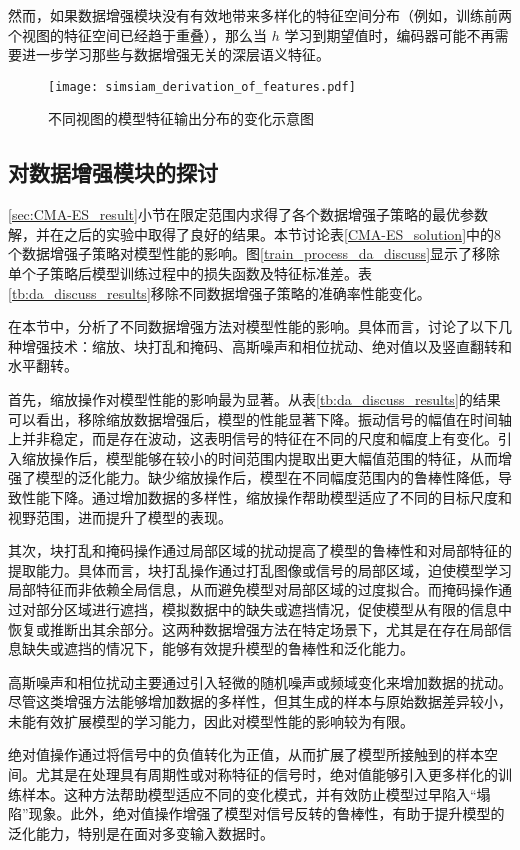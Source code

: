 \documentclass[master]{thesis-uestc}
\begin{document}
然而，如果数据增强模块没有有效地带来多样化的特征空间分布（例如，训练前两个视图的特征空间已经趋于重叠），那么当 \( h \) 学习到期望值时，编码器可能不再需要进一步学习那些与数据增强无关的深层语义特征。

\begin{figure}[h]
    \centering
    \texttt{[image: simsiam\_derivation\_of\_features.pdf]}
    \caption{不同视图的模型特征输出分布的变化示意图}
    \label{simsiam_derivation_of_features}
\end{figure}

\subsection{对数据增强模块的探讨}
\ref{sec:CMA-ES_result}小节在限定范围内求得了各个数据增强子策略的最优参数解，并在之后的实验中取得了良好的结果。本节讨论表\ref{CMA-ES_solution}中的8个数据增强子策略对模型性能的影响。图\ref{train_process_da_discuss}显示了移除单个子策略后模型训练过程中的损失函数及特征标准差。表\ref{tb:da_discuss_results}移除不同数据增强子策略的准确率性能变化。

在本节中，分析了不同数据增强方法对模型性能的影响。具体而言，讨论了以下几种增强技术：缩放、块打乱和掩码、高斯噪声和相位扰动、绝对值以及竖直翻转和水平翻转。

首先，缩放操作对模型性能的影响最为显著。从表\ref{tb:da_discuss_results}的结果可以看出，移除缩放数据增强后，模型的性能显著下降。振动信号的幅值在时间轴上并非稳定，而是存在波动，这表明信号的特征在不同的尺度和幅度上有变化。引入缩放操作后，模型能够在较小的时间范围内提取出更大幅值范围的特征，从而增强了模型的泛化能力。缺少缩放操作后，模型在不同幅度范围内的鲁棒性降低，导致性能下降。通过增加数据的多样性，缩放操作帮助模型适应了不同的目标尺度和视野范围，进而提升了模型的表现。

其次，块打乱和掩码操作通过局部区域的扰动提高了模型的鲁棒性和对局部特征的提取能力。具体而言，块打乱操作通过打乱图像或信号的局部区域，迫使模型学习局部特征而非依赖全局信息，从而避免模型对局部区域的过度拟合。而掩码操作通过对部分区域进行遮挡，模拟数据中的缺失或遮挡情况，促使模型从有限的信息中恢复或推断出其余部分。这两种数据增强方法在特定场景下，尤其是在存在局部信息缺失或遮挡的情况下，能够有效提升模型的鲁棒性和泛化能力。

高斯噪声和相位扰动主要通过引入轻微的随机噪声或频域变化来增加数据的扰动。尽管这类增强方法能够增加数据的多样性，但其生成的样本与原始数据差异较小，未能有效扩展模型的学习能力，因此对模型性能的影响较为有限。

绝对值操作通过将信号中的负值转化为正值，从而扩展了模型所接触到的样本空间。尤其是在处理具有周期性或对称特征的信号时，绝对值能够引入更多样化的训练样本。这种方法帮助模型适应不同的变化模式，并有效防止模型过早陷入“塌陷”现象。此外，绝对值操作增强了模型对信号反转的鲁棒性，有助于提升模型的泛化能力，特别是在面对多变输入数据时。
\end{document}

